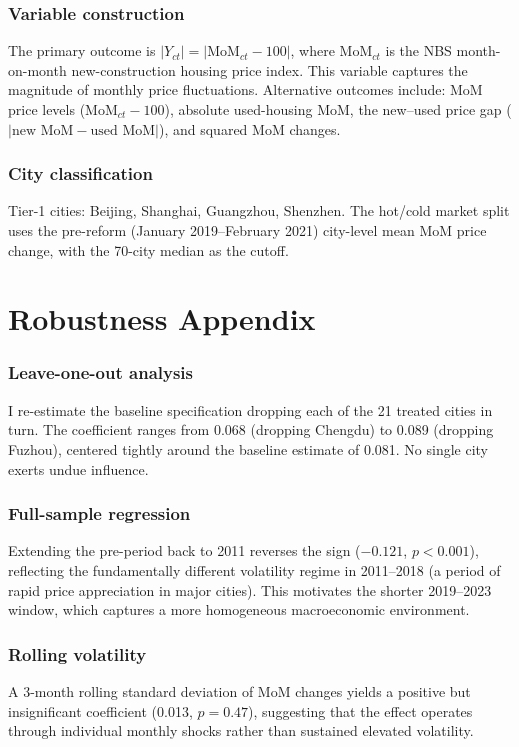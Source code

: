 \documentclass[12pt]{article}
\begin{document}
\subsubsection*{Variable construction} The primary outcome is $|Y_{ct}| = |\text{MoM}_{ct} - 100|$, where $\text{MoM}_{ct}$ is the NBS month-on-month new-construction housing price index. This variable captures the magnitude of monthly price fluctuations. Alternative outcomes include: MoM price levels ($\text{MoM}_{ct} - 100$), absolute used-housing MoM, the new--used price gap ($|\text{new MoM} - \text{used MoM}|$), and squared MoM changes.

\subsubsection*{City classification} Tier-1 cities: Beijing, Shanghai, Guangzhou, Shenzhen. The hot/cold market split uses the pre-reform (January 2019--February 2021) city-level mean MoM price change, with the 70-city median as the cutoff.

\section{Robustness Appendix}

\subsubsection*{Leave-one-out analysis} I re-estimate the baseline specification dropping each of the 21 treated cities in turn. The coefficient ranges from 0.068 (dropping Chengdu) to 0.089 (dropping Fuzhou), centered tightly around the baseline estimate of 0.081. No single city exerts undue influence.

\subsubsection*{Full-sample regression} Extending the pre-period back to 2011 reverses the sign ($-0.121$, $p < 0.001$), reflecting the fundamentally different volatility regime in 2011--2018 (a period of rapid price appreciation in major cities). This motivates the shorter 2019--2023 window, which captures a more homogeneous macroeconomic environment.

\subsubsection*{Rolling volatility} A 3-month rolling standard deviation of MoM changes yields a positive but insignificant coefficient (0.013, $p = 0.47$), suggesting that the effect operates through individual monthly shocks rather than sustained elevated volatility.
\end{document}
